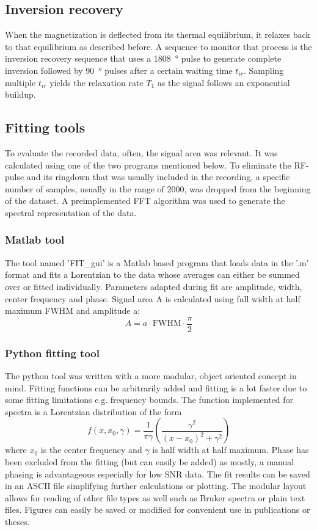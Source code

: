         \subsection{Inversion recovery}
            When the magnetization is deflected from its thermal equilibrium, it relaxes back to that equilibrium as described before. A sequence to monitor that process is the inversion recovery sequence that uses a \SI{1808}{\degree} pulse to generate complete inversion followed by \SI{90}{\degree} pulses after a certain waiting time $t_{ir}$. Sampling multiple $t_{ir}$ yields the relaxation rate $T_1$ as the signal follows an exponential buildup.
        \subsection{Fitting tools}
        To evaluate the recorded data, often, the signal area was relevant. It was calculated using one of the two programs mentioned below. To eliminate the RF-pulse and its ringdown that was usually included in the recording, a specific number of samples, usually in the range of 2000, was dropped from the beginning of the dataset. A preimplemented FFT algorithm was used to generate the spectral representation of the data.
            \subsubsection{Matlab tool}
            The tool named 'FIT\_gui' is a Matlab based program that loads data in the '.m' format and fits a Lorentzian to the data whose averages can either be summed over or fitted individually. Parameters adapted during fit are amplitude, width, center frequency and phase. Signal area A is calculated using full width at half maximum FWHM and amplitude a:
            \begin{equation}
                A=a\cdot\mathrm{FWHM}\cdot\frac{\pi}{2}
            \end{equation}
            \subsubsection{Python fitting tool}
            The python tool was written with a more modular, object oriented concept in mind. Fitting functions can be arbitrarily added and fitting is a lot faster due to some fitting limitations e.g. frequency bounds. The function implemented for spectra is a Lorentzian distribution of the form
            \begin{equation}
                f(x,x_0, \gamma) = \frac{1}{\pi\gamma}\left(\frac{\gamma^2}{(x-x_0)^2+\gamma^2}\right)
            \end{equation}
            where $x_0$ is the center frequency and $\gamma$ is half width at half maximum.
            Phase has been excluded from the fitting (but can easily be added) as mostly, a manual phasing is advantageous especially for low SNR data. The fit results can be saved in an ASCII file simplifying further calculations or plotting.
            The modular layout allows for reading of other file types as well such as Bruker spectra or plain text files.
            Figures can easily be saved or modified for convenient use in publications or theses.
